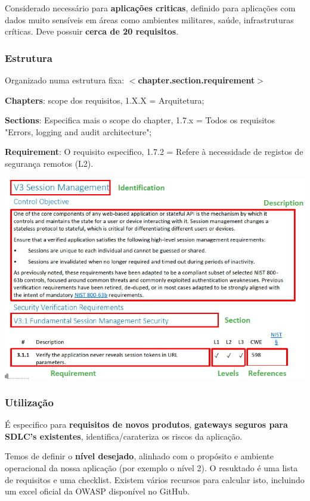 \documentclass{article}
\begin{document}
Considerado necessário para \textbf{aplicações criticas},
definido para aplicações com dados muito sensíveis em áreas
como ambientes militares, saúde, infrastruturas críticas.
Deve possuir \textbf{cerca de 20 requisitos}.

\subsubsection{Estrutura}

\begin{flushleft}
  Organizado numa estrutura fixa: \textbf{$<$chapter.section.requirement$>$}

  \vspace{1mm}

  \textbf{Chapters}: scope dos requisitos, 1.X.X = Arquitetura;

  \vspace{1mm}

  \textbf{Sections}: Especifica mais o scope do chapter, 1.7.x
  = Todos os requisitos "Errors, logging and audit architecture";
  
  \vspace{1mm}

  \textbf{Requirement}: O requisito especifico,
  1.7.2 = Refere à necessidade de registos de segurança remotos (L2).
\end{flushleft}

\begin{center}
  \includegraphics[scale=0.5]{120}
\end{center}

\pagebreak

\subsubsection{Utilização}

É especifico para \textbf{requisitos de novos produtos},
\textbf{gateways seguros para SDLC's existentes}, identifica/carateriza
os riscos da aplicação.

Temos de definir o \textbf{nível desejado}, alinhado com o propósito e
ambiente operacional da nossa aplicação (por exemplo o nível 2).
O resuktado é uma lista de requisitos e uma checklist.
Existem vários recursos para calcular isto, incluindo um
excel oficial da OWASP disponível no GitHub.
\end{document}
